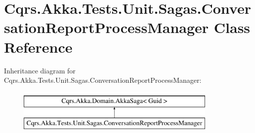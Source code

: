 \hypertarget{classCqrs_1_1Akka_1_1Tests_1_1Unit_1_1Sagas_1_1ConversationReportProcessManager}{}\section{Cqrs.\+Akka.\+Tests.\+Unit.\+Sagas.\+Conversation\+Report\+Process\+Manager Class Reference}
\label{classCqrs_1_1Akka_1_1Tests_1_1Unit_1_1Sagas_1_1ConversationReportProcessManager}
Inheritance diagram for Cqrs.\+Akka.\+Tests.\+Unit.\+Sagas.\+Conversation\+Report\+Process\+Manager\+:\begin{figure}[H]
\begin{center}
\leavevmode
\includegraphics[height=2.000000cm]{classCqrs_1_1Akka_1_1Tests_1_1Unit_1_1Sagas_1_1ConversationReportProcessManager}
\end{center}
\end{figure}
